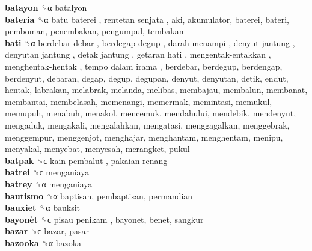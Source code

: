 \textbf{batayon} ␝α  batalyon  \\
\textbf{bateria} ␝α   batu baterei ,  rentetan senjata , aki, akumulator, baterei, bateri, pemboman, penembakan, pengumpul, tembakan  \\
\textbf{bati} ␝α   berdebar-debar ,  berdegap-degup ,  darah menampi ,  denyut jantung ,  denyutan jantung ,  detak jantung ,  getaran hati ,  mengentak-entakkan ,  menghentak-hentak ,  tempo dalam irama , berdebar, berdegup, berdengap, berdenyut, debaran, degap, degup, degupan, denyut, denyutan, detik, endut, hentak, labrakan, melabrak, melanda, melibas, membajau, membalun, membanat, membantai, membelasah, memenangi, memermak, memintasi, memukul, memupuh, menabuh, menakol, mencemuk, mendahului, mendebik, mendenyut, mengaduk, mengakali, mengalahkan, mengatasi, menggagalkan, menggebrak, menggempur, menggenjot, menghajar, menghantam, menghentam, menipu, menyakal, menyebat, menyesah, merangket, pukul  \\
\textbf{batpak} ␝ϲ   kain pembalut ,  pakaian renang   \\
\textbf{batrei} ␝ϲ  menganiaya  \\
\textbf{batrey} ␝α  menganiaya  \\
\textbf{bautismo} ␝α  baptisan, pembaptisan, permandian  \\
\textbf{bauxiet} ␝α  bauksit  \\
\textbf{bayonèt} ␝ϲ   pisau penikam , bayonet, benet, sangkur  \\
\textbf{bazar} ␝ϲ  bazar, pasar  \\
\textbf{bazooka} ␝α  bazoka  \\
